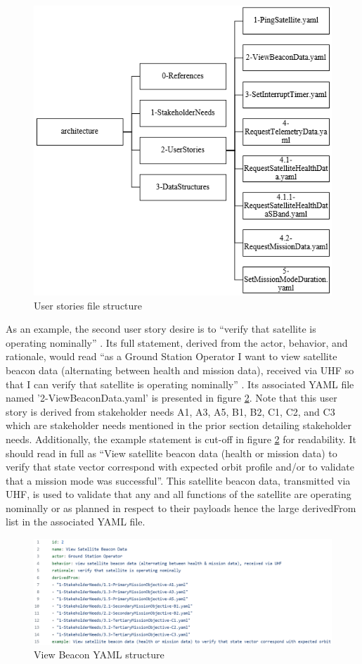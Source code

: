 \documentclass[journal,article,submit,pdftex,moreauthors]{Definitions/mdpi}
\begin{document}
\begin{figure}[H]
    \includegraphics[width=10.5 cm]{assets/userstory_file.png}
    \caption{User stories file structure}
	\label{fig:userstory_file}
    \end{figure}
	\noindent   
\unskip

As an example, the second user story desire is to “verify that satellite is operating nominally” \cite{sealion_mission_architecture}.  Its full statement, derived from the actor, behavior, and rationale, would read “as a Ground Station Operator I want to view satellite beacon data (alternating between health and mission data), received via UHF so that I can verify that satellite is operating nominally” \cite{sealion_page}.  Its associated YAML file named '2-ViewBeaconData.yaml' is presented in figure \ref{fig:view_beacon}.  Note that this user story is derived from stakeholder needs A1, A3, A5, B1, B2, C1, C2, and C3 which are stakeholder needs mentioned in the prior section detailing stakeholder needs.  Additionally, the example statement is cut-off in figure \ref{fig:view_beacon} for readability.  It should read in full as “View satellite beacon data (health or mission data) to verify that state vector correspond with expected orbit profile and/or to validate that a mission mode was successful”.  This satellite beacon data, transmitted via UHF, is used to validate that any and all functions of the satellite are operating nominally or as planned in respect to their payloads hence the large derivedFrom list in the associated YAML file.

\begin{figure}[H]
    \includegraphics[width=13.75 cm]{assets/view_beacon.png}
    \caption{View Beacon YAML structure}
	\label{fig:view_beacon}
    \end{figure}
	\noindent   
\unskip
\end{document}
